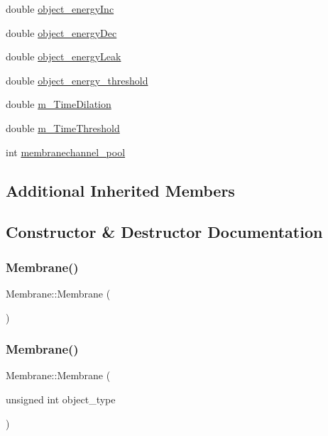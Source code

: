 \begin{DoxyCompactItemize}
double \mbox{\hyperlink{classMembrane_a013037dc858a1f81ba198434ba13701d}{object\+\_\+energy\+Inc}}
\item 
double \mbox{\hyperlink{classMembrane_a8cda5e365097454dc62f336a479a5777}{object\+\_\+energy\+Dec}}
\item 
double \mbox{\hyperlink{classMembrane_a4e80c2cad8bb2e5f026caf33ce90d7f0}{object\+\_\+energy\+Leak}}
\item 
double \mbox{\hyperlink{classMembrane_aa91a60ecdefc7dd375208bc4f73c6d80}{object\+\_\+energy\+\_\+threshold}}
\item 
double \mbox{\hyperlink{classMembrane_a28a7100c84ccee492664edd47fd206e3}{m\+\_\+\+Time\+Dilation}}
\item 
double \mbox{\hyperlink{classMembrane_ade7f8f4b0839c78f33c95fe90a5187b9}{m\+\_\+\+Time\+Threshold}}
\item 
int \mbox{\hyperlink{classMembrane_a2d39f4e61a2cc3c5b4db5e5ff5689e76}{membranechannel\+\_\+pool}}
\end{DoxyCompactItemize}
\subsection*{Additional Inherited Members}


\subsection{Constructor \& Destructor Documentation}
\mbox{\label{classMembrane_ae3db1e55d9a535226bfd41c2a9ac1f0c}} 
\subsubsection{\texorpdfstring{Membrane()}{Membrane()}\hspace{0.1cm}{\footnotesize\ttfamily [1/4]}}
{\footnotesize\ttfamily Membrane\+::\+Membrane (\begin{DoxyParamCaption}{ }\end{DoxyParamCaption})\hspace{0.3cm}{\ttfamily [inline]}}

\mbox{\label{classMembrane_a9e45fcb5a4e791f2697fce4d9fa78a3f}} 
\subsubsection{\texorpdfstring{Membrane()}{Membrane()}\hspace{0.1cm}{\footnotesize\ttfamily [2/4]}}
{\footnotesize\ttfamily Membrane\+::\+Membrane (\begin{DoxyParamCaption}\item[{unsigned int}]{object\+\_\+type }\end{DoxyParamCaption})\hspace{0.3cm}{\ttfamily [inline]}}

